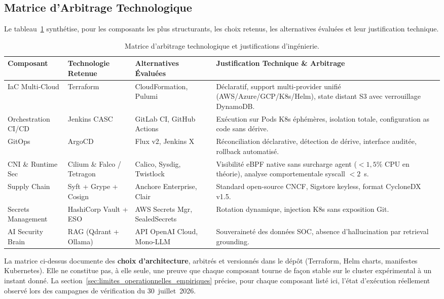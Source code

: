 \subsection{Matrice d'Arbitrage Technologique}

Le tableau~\ref{tab:choix_technologiques} synthétise, pour les composants les plus structurants, les choix retenus, les alternatives évaluées et leur justification technique.

\begin{table}[H]
\centering
\scriptsize
\begin{tabular}{@{}p{2.6cm}p{3.2cm}p{3.2cm}p{4.4cm}@{}}
\toprule
\textbf{Composant} & \textbf{Technologie Retenue} & \textbf{Alternatives Évaluées} & \textbf{Justification Technique \& Arbitrage} \\
\midrule
IaC Multi-Cloud & Terraform & CloudFormation, Pulumi & Déclaratif, support multi-provider unifié (AWS/Azure/GCP/K8s/Helm), state distant S3 avec verrouillage DynamoDB. \\
Orchestration CI/CD & Jenkins CASC & GitLab CI, GitHub Actions & Exécution sur Pods K8s éphémères, isolation totale, configuration as code sans dérive. \\
GitOps & ArgoCD & Flux v2, Jenkins X & Réconciliation déclarative, détection de dérive, interface auditée, rollback automatisé. \\
CNI \& Runtime Sec & Cilium \& Falco / Tetragon & Calico, Sysdig, Twistlock & Visibilité eBPF native sans surcharge agent ($<1{,}5\%$ CPU en théorie), analyse comportementale syscall $<2$~s. \\
Supply Chain & Syft + Grype + Cosign & Anchore Enterprise, Clair & Standard open-source CNCF, Sigstore keyless, format CycloneDX v1.5. \\
Secrets Management & HashiCorp Vault + ESO & AWS Secrets Mgr, SealedSecrets & Rotation dynamique, injection K8s sans exposition Git. \\
AI Security Brain & RAG (Qdrant + Ollama) & API OpenAI Cloud, Mono-LLM & Souveraineté des données SOC, absence d'hallucination par retrieval grounding. \\
\bottomrule
\end{tabular}
\caption{Matrice d'arbitrage technologique et justifications d'ingénierie.}
\label{tab:choix_technologiques}
\end{table}

\begin{tcolorbox}[colback=LightGray!30, colframe=clrBlue, arc=3pt,
    title={\small\bfseries Note de lecture — Choix retenu $\neq$ état d'exécution observé}]
\footnotesize
La matrice ci-dessus documente des \textbf{choix d'architecture}, arbitrés et versionnés dans le dépôt (Terraform, Helm charts, manifestes Kubernetes). Elle ne constitue pas, à elle seule, une preuve que chaque composant tourne de façon stable sur le cluster expérimental à un instant donné. La section~\ref{sec:limites_operationnelles_empiriques} précise, pour chaque composant listé ici, l'état d'exécution réellement observé lors des campagnes de vérification du 30~juillet~2026.
\end{tcolorbox}


